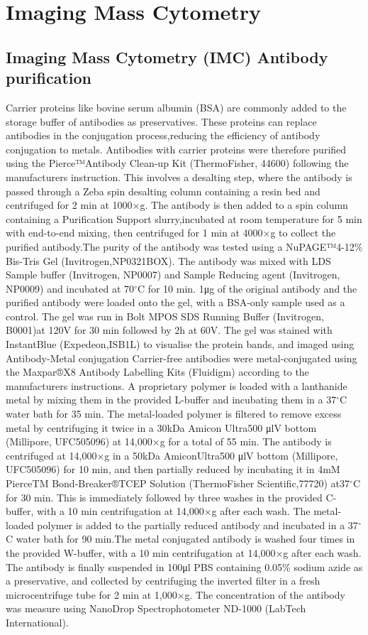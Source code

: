\section{Imaging Mass Cytometry}
\subsection{Imaging Mass Cytometry (IMC) Antibody purification}
Carrier proteins like bovine serum albumin (BSA) are commonly added to the storage buffer of antibodies as preservatives. These proteins can replace antibodies in the conjugation process,reducing the efficiency of antibody conjugation to metals. Antibodies with carrier proteins were therefore purified using the Pierce™Antibody Clean-up Kit (ThermoFisher, 44600) following the manufacturers instruction.  This involves a desalting step, where the antibody is passed through a Zeba spin desalting column containing a resin bed and centrifuged for 2 min at 1000×g. The antibody is then added to a spin column containing a Purification Support slurry,incubated at room temperature for 5 min with end-to-end mixing, then centrifuged for 1 min at 4000×g to collect the purified antibody.The purity of the antibody was tested using a NuPAGE™4-12\% Bis-Tris Gel (Invitrogen,NP0321BOX). The antibody was mixed with LDS Sample buffer (Invitrogen, NP0007) and Sample Reducing agent (Invitrogen, NP0009) and incubated at 70${^\circ}$C for 10 min. 1μg of the original antibody and the purified antibody were loaded onto the gel, with a BSA-only sample used as a control. The gel was run in Bolt MPOS SDS Running Buffer (Invitrogen, B0001)at 120V for 30 min followed by 2h at 60V. The gel was stained with InstantBlue (Expedeon,ISB1L) to visualise the protein bands, and imaged using Antibody-Metal conjugation Carrier-free antibodies were metal-conjugated using the Maxpar®X8 Antibody Labelling Kits (Fluidigm) according to the manufacturers instructions. A proprietary polymer is loaded with a lanthanide metal by mixing them in the provided L-buffer and incubating them in a 37${^\circ}$C water bath for 35 min. The metal-loaded polymer is filtered to remove excess metal by centrifuging it twice in a 30kDa Amicon Ultra500 μlV bottom (Millipore, UFC505096) at 14,000×g for a total of 55 min. The antibody is centrifuged at 14,000×g in a 50kDa AmiconUltra500 μlV bottom (Millipore,  UFC505096) for 10 min,  and then partially reduced by incubating it in 4mM PierceTM Bond-Breaker®TCEP Solution (ThermoFisher Scientific,77720) at37${^\circ}$C for 30 min.  This is immediately followed by three washes in the provided C-buffer, with a 10 min centrifugation at 14,000×g after each wash. The metal-loaded polymer is added to the partially reduced antibody and incubated in a 37${^\circ}$C water bath for 90 min.The metal conjugated antibody is washed four times in the provided W-buffer, with a 10 min centrifugation at 14,000×g after each wash. The antibody is finally suspended in 100μl PBS containing 0.05\% sodium azide as a preservative, and collected by centrifuging the inverted filter in a fresh microcentrifuge tube for 2 min at 1,000×g. The concentration of the antibody was measure using NanoDrop Spectrophotometer ND-1000 (LabTech International).

